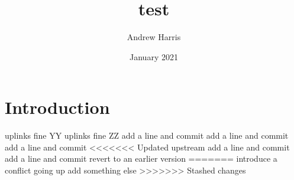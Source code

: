 \documentclass{article}
\title{test}
\author{Andrew Harris}
\date{January 2021}
\begin{document}
\maketitle

\section{Introduction}
uplinks fine YY
uplinks fine ZZ
add a line and commit
add a line and commit
add a line and commit
<<<<<<< Updated upstream
add a line and commit
add a line and commit
revert to an earlier version
=======
introduce a conflict going up
add something else
>>>>>>> Stashed changes
\end{document}
